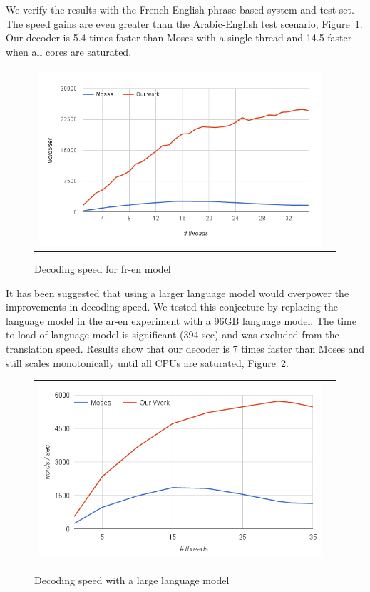 \documentclass[]{article}
\begin{document}
We verify the results with the French-English phrase-based system and test set. The speed gains are even greater than the Arabic-English test scenario, Figure~\ref{fig:fr-en-speed}. Our decoder is 5.4 times faster than Moses with a single-thread and 14.5 faster when all cores are saturated.
\begin{figure}[h]
\centering
\begin{tabular}{cc}
{\includegraphics[scale=0.4]{fr-en-speed.png}} 
\end{tabular}
\caption{Decoding speed for fr-en model}
\label{fig:fr-en-speed}
\end{figure} 

It has been suggested that using a larger language model would overpower the improvements in decoding speed. We tested this conjecture by replacing the language model in the ar-en experiment with a 96GB language model. The time to load of language model is significant (394 sec) and was excluded from the translation speed. Results show that our decoder is 7 times faster than Moses and still scales monotonically until all CPUs are saturated, Figure~\ref{fig:large-lm}.
\begin{figure}[h]
\centering
\begin{tabular}{cc}
{\includegraphics[scale=0.4]{large-lm.png}} 
\end{tabular}
\caption{Decoding speed with a large language model}
\label{fig:large-lm}
\end{figure} 
\end{document}
